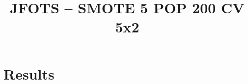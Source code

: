 \documentclass{llncs}
\title{JFOTS -- SMOTE 5 POP 200 CV 5x2}
\begin{document}
\maketitle

\section{Results}
















\end{document}
